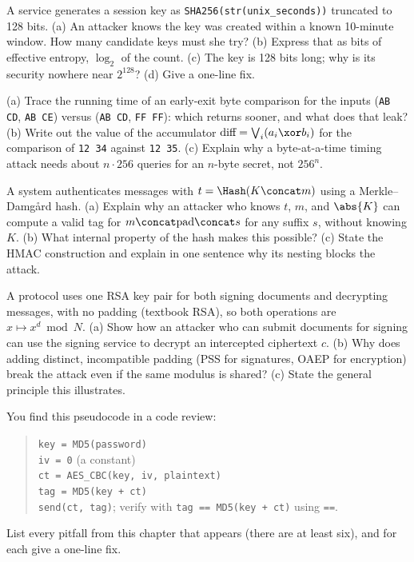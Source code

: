 \begin{exercise}
\label{ch38:ex-entropy}
A service generates a session key as \texttt{SHA256(str(unix\_seconds))} truncated to 128 bits. (a) An attacker knows the key was created within a known 10-minute window. How many candidate keys must she try? (b) Express that as bits of effective entropy, $\log_2$ of the count. (c) The key is 128 bits long; why is its security nowhere near $2^{128}$? (d) Give a one-line fix.
\end{exercise}

\begin{exercise}
\label{ch38:ex-ct}
(a) Trace the running time of an early-exit byte comparison for the inputs (\texttt{AB CD}, \texttt{AB CE}) versus (\texttt{AB CD}, \texttt{FF FF}): which returns sooner, and what does that leak? (b) Write out the value of the accumulator $\text{diff} = \bigvee_i (a_i \xor b_i)$ for the comparison of \texttt{12 34} against \texttt{12 35}. (c) Explain why a byte-at-a-time timing attack needs about $n \cdot 256$ queries for an $n$-byte secret, not $256^n$.
\end{exercise}

\begin{exercise}
\label{ch38:ex-lenext}
A system authenticates messages with $t = \Hash(K \concat m)$ using a Merkle--Damg{\aa}rd hash. (a) Explain why an attacker who knows $t$, $m$, and $\abs{K}$ can compute a valid tag for $m \concat \text{pad} \concat s$ for any suffix $s$, without knowing $K$. (b) What internal property of the hash makes this possible? (c) State the HMAC construction and explain in one sentence why its nesting blocks the attack.
\end{exercise}

\begin{exercise}
\label{ch38:ex-keyreuse}
A protocol uses one RSA key pair for both signing documents and decrypting messages, with no padding (textbook RSA), so both operations are $x \mapsto x^d \bmod N$. (a) Show how an attacker who can submit documents for signing can use the signing service to decrypt an intercepted ciphertext $c$. (b) Why does adding distinct, incompatible padding (PSS for signatures, OAEP for encryption) break the attack even if the same modulus is shared? (c) State the general principle this illustrates.
\end{exercise}

\begin{exercise}
\label{ch38:ex-audit}
You find this pseudocode in a code review:
\begin{quote}
\texttt{key = MD5(password)} \\
\texttt{iv = 0} \quad (a constant) \\
\texttt{ct = AES\_CBC(key, iv, plaintext)} \\
\texttt{tag = MD5(key + ct)} \\
\texttt{send(ct, tag)}; \quad verify with \texttt{tag == MD5(key + ct)} using \texttt{==}.
\end{quote}
List every pitfall from this chapter that appears (there are at least six), and for each give a one-line fix.
\end{exercise}

